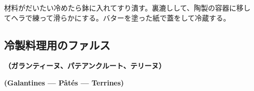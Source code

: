 \begin{recette}
材料がだいたい冷めたら鉢に入れてすり潰す。裏漉しして、陶製の容器に移し
てヘラで練って滑らかにする。バターを塗った紙で蓋をして冷蔵する。
\end{recette}
\hypertarget{farce-pour-les-pieces-froides}{%
\subsection{冷製料理用のファルス}\label{farce-pour-les-pieces-froides}}

\vspace{-1.5\zw}
\begin{center}
\textbf{（ガランティーヌ、パテアンクルート、テリーヌ）}
\end{center}
\vspace{.5\zw}
\begin{center}
\vspace{-1\zw}
\hspace{1\zw}\textbf{(Galantines --- Pâtés --- Terrines)}
\end{center}



